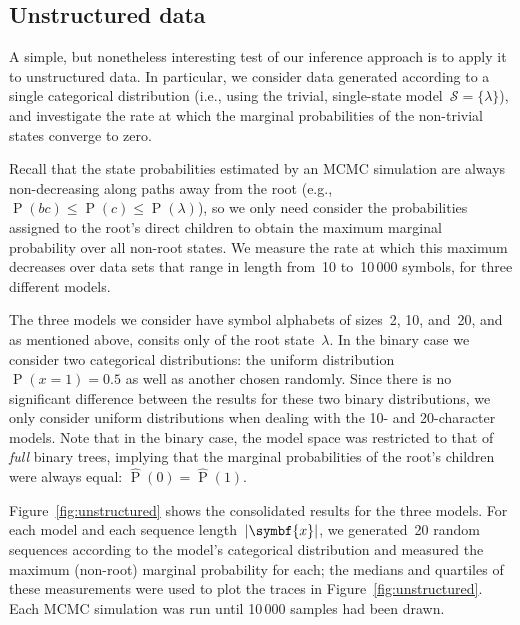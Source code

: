 \documentclass[12pt,a4paper]{article}
\newcommand\mc[1]{\mathcal{#1}}               %
\newcommand\ub[1]{\symbf{#1}}                 %
\DeclareMathOperator\Pb{P}                    %
\DeclarePairedDelimiter\abs{\lvert}{\rvert}   %
\newcommand\peq{\mathop{=}}   %
\begin{document}

\subsection{Unstructured data}\label{sec:unstructured} %

A simple, but nonetheless interesting test of our inference approach is to apply
it to unstructured data. In particular, we consider data generated according to
a single categorical distribution (i.e., using the trivial, single-state
model~\(\mc{S} = \{\lambda\}\)), and investigate the rate at which the marginal
probabilities of the non-trivial states converge to zero.

Recall that the state probabilities estimated by an MCMC simulation are always
non-decreasing along paths away from the root (e.g., \(\Pb(bc) \le \Pb(c) \le
\Pb(\lambda)\)), so we only need consider the probabilities assigned to the
root's direct children to obtain the maximum marginal probability over all
non-root states. We measure the rate at which this maximum decreases over data
sets that range in length from~10 to~10\,000 symbols, for three different
models.

The three models we consider have symbol alphabets of sizes~2, 10, and~20, and
as mentioned above, consits only of the root state~\(\lambda\). In the binary
case we consider two categorical distributions: the uniform distribution~\(\Pb(x
\peq 1) = 0.5\) as well as another chosen randomly. Since there is no
significant difference between the results for these two binary distributions,
we only consider uniform distributions when dealing with the 10- and
20-character models. Note that in the binary case, the model space was
restricted to that of \emph{full} binary trees, implying that the marginal
probabilities of the root's children were always equal: \(\hat{\Pb}(0) =
\hat{\Pb}(1)\).

Figure~\ref{fig:unstructured} shows the consolidated results for the three
models. For each model and each sequence length~\(\abs{\ub{x}}\), we
generated~20 random sequences according to the model's categorical distribution
and measured the maximum (non-root) marginal probability for each; the medians
and quartiles of these measurements were used to plot the traces in
Figure~\ref{fig:unstructured}. Each MCMC simulation was run until 10\,000
samples had been drawn.
%

\end{document}
